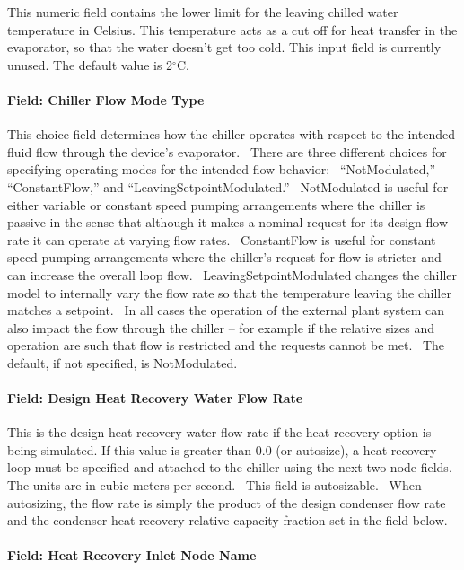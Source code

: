 This numeric field contains the lower limit for the leaving chilled water temperature in Celsius. This temperature acts as a cut off for heat transfer in the evaporator, so that the water doesn't get too cold. This input field is currently unused. The default value is 2$^\circ$C.

\paragraph{Field: Chiller Flow Mode Type}\label{field-chiller-flow-mode-type}

This choice field determines how the chiller operates with respect to the intended fluid flow through the device's evaporator.~ There are three different choices for specifying operating modes for the intended flow behavior:~ ``NotModulated,'' ``ConstantFlow,'' and ``LeavingSetpointModulated.''~ NotModulated is useful for either variable or constant speed pumping arrangements where the chiller is passive in the sense that although it makes a nominal request for its design flow rate it can operate at varying flow rates.~ ConstantFlow is useful for constant speed pumping arrangements where the chiller's request for flow is stricter and can increase the overall loop flow.~ LeavingSetpointModulated changes the chiller model to internally vary the flow rate so that the temperature leaving the chiller matches a setpoint.~ In all cases the operation of the external plant system can also impact the flow through the chiller -- for example if the relative sizes and operation are such that flow is restricted and the requests cannot be met.~ The default, if not specified, is NotModulated.

\paragraph{Field: Design Heat Recovery Water Flow Rate}\label{field-design-heat-recovery-water-flow-rate-2}

This is the design heat recovery water flow rate if the heat recovery option is being simulated. If this value is greater than 0.0 (or autosize), a heat recovery loop must be specified and attached to the chiller using the next two node fields. The units are in cubic meters per second.~ This field is autosizable.~ When autosizing, the flow rate is simply the product of the design condenser flow rate and the condenser heat recovery relative capacity fraction set in the field below.

\paragraph{Field: Heat Recovery Inlet Node Name}\label{field-heat-recovery-inlet-node-name-2}

